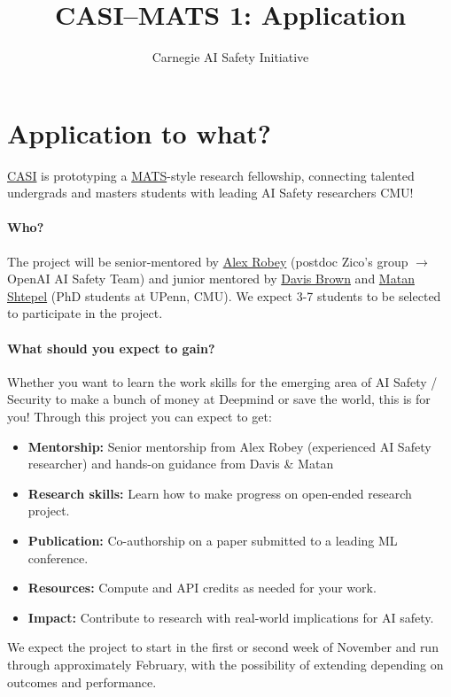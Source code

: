 \documentclass[11pt]{article}
\title{CASI--MATS 1: Application}
\author{Carnegie AI Safety Initiative}
\begin{document}
\maketitle


\section{Application to what?}

\href{https://cmuaisafety.com/}{CASI} is prototyping a \href{https://www.matsprogram.org/}{MATS}-style research fellowship, connecting talented undergrads and masters students with leading AI Safety researchers \@ CMU! 

\paragraph{Who?}
The project will be senior-mentored by \href{https://arobey1.github.io/}{Alex Robey} (postdoc \@ Zico's group $\rightarrow$ OpenAI AI Safety Team) and junior mentored by \href{https://davisrbrown.com/}{Davis Brown} and \href{https://matanshtepel.com/}{Matan Shtepel} (PhD students at UPenn, CMU).
We expect 3-7 students to be selected to participate in the project.

\paragraph{What should you expect to gain?}
Whether you want to learn the work skills for the emerging area of AI Safety / Security to make a bunch of money at Deepmind or save the world, this is for you! Through this project you can expect to get:   

\begin{itemize}[noitemsep]
    \item \textbf{Mentorship:} Senior mentorship from Alex Robey (experienced AI Safety researcher) and hands-on guidance from Davis \& Matan
    \item \textbf{Research skills:} Learn how to make progress on open-ended research project.
    \item \textbf{Publication:} Co-authorship on a paper submitted to a leading ML conference.
    \item \textbf{Resources:} Compute and API credits as needed for your work.
    \item \textbf{Impact:} Contribute to research with real-world implications for AI safety.
\end{itemize}
We expect the project to start in the first or second week of November and run through approximately February, with the possibility of extending depending on outcomes and performance. 
\end{document}

